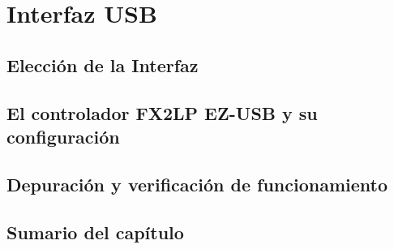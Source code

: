 \chapter{Interfaz USB}
	
	\label{cap:cy}
	\section{Elección de la Interfaz}
		
	\section{El controlador FX2LP EZ-USB y su configuración}
		
%		
		
	\section{Depuración y verificación de funcionamiento}
		
	\section{Sumario del capítulo}
		